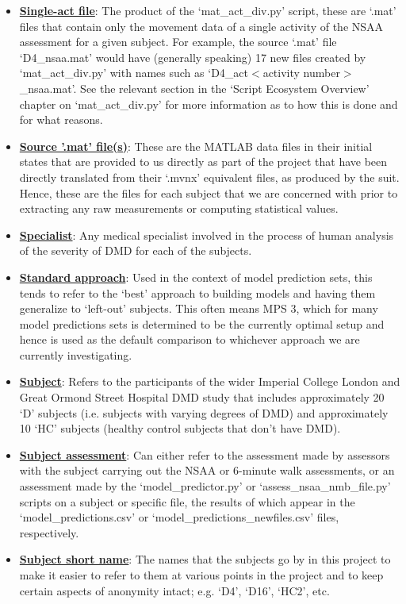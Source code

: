 \documentclass[12pt,twoside]{report}
\begin{document}
\begin{itemize}
	\item \underline{\textbf{Single-act file}}: The product of the ‘mat\_act\_div.py’ script, these are ‘.mat’ files that contain only the movement data of a single activity of the NSAA assessment for a given subject. For example, the source ‘.mat’ file ‘D4\_nsaa.mat’ would have (generally speaking) 17 new files created by ‘mat\_act\_div.py’ with names such as ‘D4\_act$<$activity number$>$\_nsaa.mat’. See the relevant section in the ‘Script Ecosystem Overview’ chapter on ‘mat\_act\_div.py’ for more information as to how this is done and for what reasons.
	\item \underline{\textbf{Source '.mat' file(s)}}: These are the MATLAB data files in their initial states that are provided to us directly as part of the project that have been directly translated from their ‘.mvnx’ equivalent files, as produced by the suit. Hence, these are the files for each subject that we are concerned with prior to extracting any raw measurements or computing statistical values.
	\item \underline{\textbf{Specialist}}: Any medical specialist involved in the process of human analysis of the severity of DMD for each of the subjects.
	\item \underline{\textbf{Standard approach}}: Used in the context of model prediction sets, this tends to refer to the ‘best’ approach to building models and having them generalize to ‘left-out’ subjects. This often means MPS 3, which for many model predictions sets is determined to be the currently optimal setup and hence is used as the default comparison to whichever approach we are currently investigating.
	\item \underline{\textbf{Subject}}: Refers to the participants of the wider Imperial College London and Great Ormond Street Hospital DMD study that includes approximately 20 ‘D’ subjects (i.e. subjects with varying degrees of DMD) and approximately 10 ‘HC’ subjects (healthy control subjects that don’t have DMD).
	\item \underline{\textbf{Subject assessment}}: Can either refer to the assessment made by assessors with the subject carrying out the NSAA or 6-minute walk assessments, or an assessment made by the ‘model\_predictor.py’ or ‘assess\_nsaa\_nmb\_file.py’ scripts on a subject or specific file, the results of which appear in the ‘model\_predictions.csv’ or ‘model\_predictions\_newfiles.csv’ files, respectively.
	\item \underline{\textbf{Subject short name}}: The names that the subjects go by in this project to make it easier to refer to them at various points in the project and to keep certain aspects of anonymity intact; e.g. ‘D4’, ‘D16’, ‘HC2’, etc.

\end{itemize}
\end{document}
